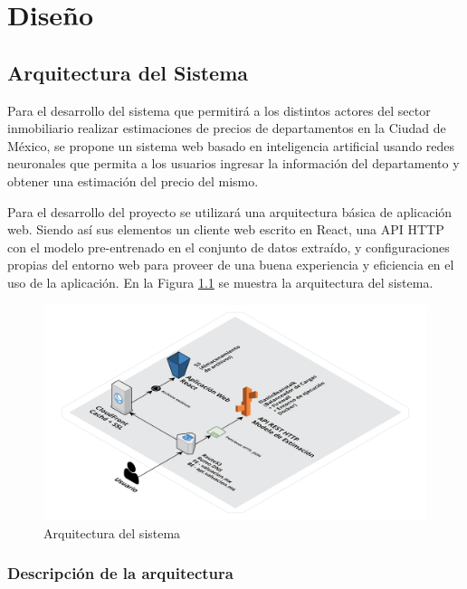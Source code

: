 \chapter{\textcolor{azulescom}{Diseño}}

\section{Arquitectura del Sistema}

Para el desarrollo del sistema que permitirá a los distintos actores del sector
inmobiliario realizar estimaciones de precios de departamentos en la Ciudad de
México, se propone un sistema web basado en inteligencia artificial usando redes
neuronales que permita a los usuarios ingresar la información del departamento
y obtener una estimación del precio del mismo.

Para el desarrollo del proyecto se utilizará una arquitectura básica de
aplicación web. Siendo así sus elementos un cliente web escrito en React,
una API HTTP con el modelo pre-entrenado en el conjunto de datos extraído, y
configuraciones propias del entorno web para proveer de una buena experiencia
y eficiencia en el uso de la aplicación. En la Figura \ref{fig:arquitectura}
se muestra la arquitectura del sistema.

\begin{figure}[H]
    \centering
    \includegraphics[width=\textwidth]{imagenes/04-diseno/arquitectura-general.png}
    \caption{Arquitectura del sistema}
    \label{fig:arquitectura}
\end{figure}

\subsection{Descripción de la arquitectura}

